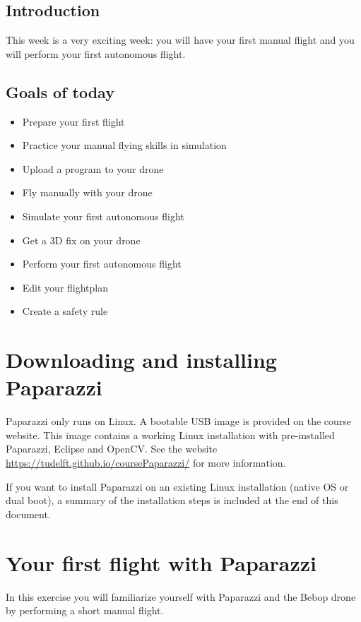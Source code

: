 \documentclass{article}
\begin{document}

\subsection*{Introduction}
This week is a very exciting week: you will have your first manual flight and you will perform your first autonomous flight.

\subsection*{Goals of today}
\begin{itemize}
\item Prepare your first flight
\item Practice your manual flying skills in simulation
\item Upload a program to your drone
\item Fly manually with your drone
\item Simulate your first autonomous flight
\item Get a 3D fix on your drone
\item Perform your first autonomous flight
\item Edit your flightplan
\item Create a safety rule
\end{itemize}

\section*{Downloading and installing Paparazzi}
Paparazzi only runs on Linux.
A bootable USB image is provided on the course website. This image contains a working Linux installation with pre-installed Paparazzi, Eclipse and OpenCV. See the website \url{https://tudelft.github.io/coursePaparazzi/} for more information.

If you want to install Paparazzi on an existing Linux installation (native OS or dual boot), a summary of the installation steps is included at the end of this document.




\section*{Your first flight with Paparazzi}
In this exercise you will familiarize yourself with Paparazzi and the Bebop drone by performing a short manual flight.
\end{document}
